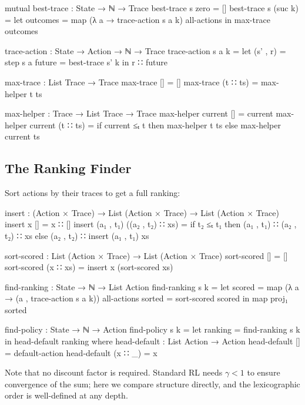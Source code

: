 \documentclass[9pt,a4paper]{article}
\theoremstyle{plain}
\theoremstyle{definition}
\theoremstyle{remark}
\begin{document}
\begin{code}
  mutual
    best-trace : State → ℕ → Trace
    best-trace s zero    = []
    best-trace s (suc k) =
      let outcomes = map (λ a → trace-action s a k) all-actions
      in max-trace outcomes

    trace-action : State → Action → ℕ → Trace
    trace-action s a k =
      let (s' , r) = step s a
          future   = best-trace s' k
      in r ∷ future

    max-trace : List Trace → Trace
    max-trace []       = []
    max-trace (t ∷ ts) = max-helper t ts

    max-helper : Trace → List Trace → Trace
    max-helper current [] = current
    max-helper current (t ∷ ts) =
      if current ≤ₜ t
      then max-helper t ts
      else max-helper current ts
\end{code}

\subsection{The Ranking Finder}

Sort actions by their traces to get a full ranking:

\begin{code}
  insert : (Action × Trace) → List (Action × Trace) → List (Action × Trace)
  insert x [] = x ∷ []
  insert (a₁ , t₁) ((a₂ , t₂) ∷ xs) =
    if t₂ ≤ₜ t₁
    then (a₁ , t₁) ∷ (a₂ , t₂) ∷ xs
    else (a₂ , t₂) ∷ insert (a₁ , t₁) xs

  sort-scored : List (Action × Trace) → List (Action × Trace)
  sort-scored [] = []
  sort-scored (x ∷ xs) = insert x (sort-scored xs)

  find-ranking : State → ℕ → List Action
  find-ranking s k =
    let scored = map (λ a → (a , trace-action s a k)) all-actions
        sorted = sort-scored scored
    in map proj₁ sorted

  find-policy : State → ℕ → Action
  find-policy s k =
    let ranking = find-ranking s k
    in head-default ranking
    where
      head-default : List Action → Action
      head-default []      = default-action
      head-default (x ∷ _) = x
\end{code}

\noindent Note that no discount factor is required.  Standard RL needs $\gamma < 1$ to ensure convergence of the sum; here we compare structure directly, and the lexicographic order is well-defined at any depth.

\end{document}
